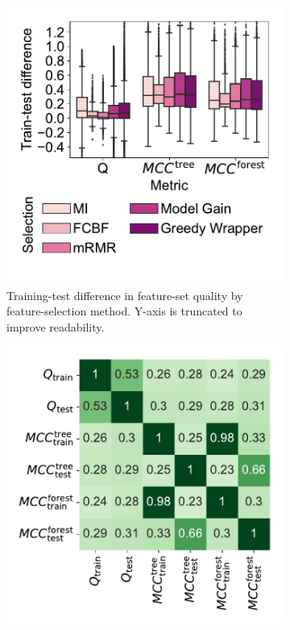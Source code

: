 \documentclass{article}
\theoremstyle{definition}
\begin{document}
\begin{figure}[t]
	\centering
	\begin{subfigure}[t]{0.48\textwidth}
		\centering
		\includegraphics[width=\textwidth, trim=15 15 15 15, clip]{plots/afs-evaluation-metrics-overfitting.pdf}
		\caption{
			Training-test difference in feature-set quality by feature-selection method.
			Y-axis is truncated to improve readability.
		}
		\label{fig:afs:evaluation-metrics-overfitting}
	\end{subfigure}
	\hfill
	\begin{subfigure}[t]{0.48\textwidth}
		\centering
		\includegraphics[width=\textwidth, trim=15 15 15 15, clip]{plots/afs-evaluation-metrics-correlation.pdf}

\end{subfigure}
\end{figure}
\end{document}
